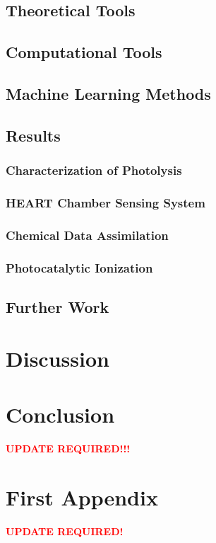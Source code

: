 \documentclass[doublespacing]{utdthesis}
\begin{document}
\section{Theoretical Tools}
\section{Computational Tools}
\section{Machine Learning Methods}
\section{Results}
\subsection{Characterization of Photolysis}
\subsection{HEART Chamber Sensing System}
\subsection{Chemical Data Assimilation}
\subsection{Photocatalytic Ionization}
\section{Further Work}

\chapter{Discussion}

\chapter{Conclusion}
\textcolor{red}{\textbf{UPDATE REQUIRED!!!}}



\appendix %

\chapter{First Appendix}
\textcolor{red}{\textbf{UPDATE REQUIRED!}}
\end{document}
